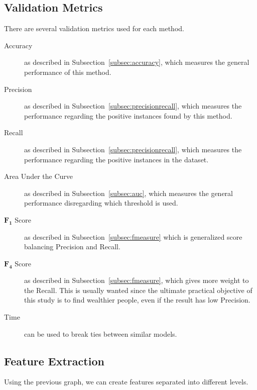 \subsection{Validation Metrics}
\label{subsec:validationmetrics}
There are several validation metrics used for each method.

\begin{description}
	\item[Accuracy] as described in Subsection~\ref{subsec:accuracy}, which measures the general performance of this method.
	\item[Precision] as described in Subsection~\ref{subsec:precisionrecall}, which measures the performance regarding the positive instances found by this method.
	\item[Recall] as described in Subsection~\ref{subsec:precisionrecall}, which measures the performance regarding the positive instances in the dataset.
	\item[Area Under the Curve] as described in Subsection~\ref{subsec:auc}, which measures the general performance disregarding which threshold is used.
	\item[$\mathbf{F_1}$ Score] as described in Subsection~\ref{subsec:fmeasure} which is generalized score balancing Precision and Recall.
	\item[$\mathbf{F_4}$ Score] as described in Subsection~\ref{subsec:fmeasure}, which gives more weight to the Recall. This is usually wanted since the ultimate practical objective of this study is to find wealthier people, even if the result has low Precision.
	\item[Time] can be used to break ties between similar models.
\end{description}

\subsection{Feature Extraction}
\label{subsec:featureextraction}
Using the previous graph, we can create features separated into different levels.

